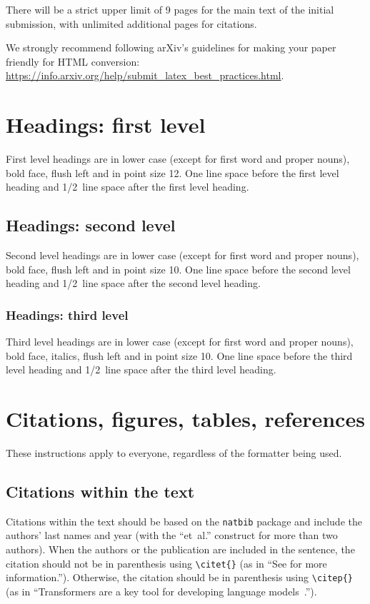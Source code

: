 \documentclass{article} %
\begin{document}
There will be a strict upper limit of 9 pages for the main text of the initial submission, with unlimited additional pages for citations.

We strongly recommend following arXiv's guidelines for making your paper friendly for HTML conversion: \url{https://info.arxiv.org/help/submit_latex_best_practices.html}.


\section{Headings: first level}
\label{headings}

First level headings are in lower case (except for first word and proper nouns), bold face,
flush left and in point size 12. One line space before the first level
heading and 1/2~line space after the first level heading.

\subsection{Headings: second level}

Second level headings are in lower case (except for first word and proper nouns), bold face,
flush left and in point size 10. One line space before the second level
heading and 1/2~line space after the second level heading.

\subsubsection{Headings: third level}

Third level headings are in lower case (except for first word and proper nouns), bold face, italics,
flush left and in point size 10. One line space before the third level
heading and 1/2~line space after the third level heading.

\section{Citations, figures, tables, references}\label{others}

These instructions apply to everyone, regardless of the formatter being used.

\subsection{Citations within the text}

Citations within the text should be based on the \texttt{natbib} package
and include the authors' last names and year (with the ``et~al.'' construct
for more than two authors). When the authors or the publication are
included in the sentence, the citation should not be in parenthesis using \verb|\citet{}| (as
in ``See \citet{Vaswani+2017} for more information.''). Otherwise, the citation
should be in parenthesis using \verb|\citep{}| (as in ``Transformers are a key tool
for developing language models~\citep{Vaswani+2017}.'').
\end{document}
